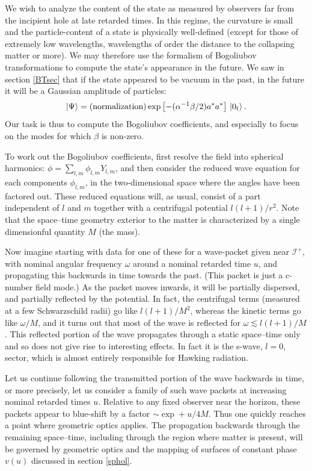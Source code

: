 \documentclass[
%
draft    %
,numberedheadings 
,bibliocites
  ]
  {aipproc}
\newcommand{\scrif}{{{\mathscr I}^{+}}}
\newcommand{\vv}{{v}}
\begin{document}
We wish to analyze the content of the state as measured by observers far from the incipient hole at late retarded times.  In this regime, the curvature is small and the particle-content of a state is physically well-defined (except for those of extremely low wavelengths, wavelengths of order the distance to the collapsing matter or more).  
We may therefore use the formalism of Bogoliubov transformations to compute the state's appearance in the future.  We saw in section \ref{BTsec} that if the state appeared to be vacuum in the past, in the future it will be a Gaussian amplitude of particles:
\begin{equation}
|\Psi \rangle =\mbox{(normalization)}\exp \left[-(\alpha ^{-1}\beta /2)a^*a^*\right]\, |0_{\rm f}\rangle\, .
\end{equation}
Our task is thus to compute the Bogoliubov coefficients, and especially to focus on the modes for which $\beta$ is non-zero.

To work out the Bogoliubov coefficients, first resolve the field into spherical harmonics:
$\phi =\sum _{l,m}\phi _{l,m} Y_{l,m}$, and then consider the reduced wave equation for each components $\phi _{l,m}$, in the two-dimensional space where the angles have been factored out.  These reduced equations will, as usual, consist of a part independent of $l$ and $m$ together with a centrifugal potential $l(l+1)/r^2$.
Note that the space--time geometry exterior to the matter is characterized by a single dimensionful quantity $M$ (the mass).



Now imagine starting with data for one of these for a wave-packet given near $\scrif$, with nominal angular frequency $\omega$ around a nominal retarded time $u$,
and propagating this backwards in time towards the past.
(This packet is just a c-number field mode.)
As the packet moves inwards, it will be partially dispersed, and partially reflected by the potential.  
In fact, the centrifugal terms (measured at a few Schwarzschild radii) go like $l(l+1)/M^2$, whereas the kinetic terms go like $\omega /M$, and it turns out that most of the wave is reflected for $\omega \lesssim l(l+1)/M$.  This reflected portion of the wave propagates through a static space--time only and so does not give rise to interesting effects.  In fact it is the s-wave, $l=0$, sector, which is almost entirely responsible for Hawking radiation.

Let us continue following the transmitted portion of the wave backwards in time, or more precisely, let us consider a family of such wave packets at increasing nominal retarded times $u$.
Relative to any fixed observer near the horizon, these packets appear to blue-shift by a factor $\sim\exp +u/4M$.  Thus one quickly reaches a point where geometric optics applies.  The propagation backwards through the remaining space--time, including through the region where matter is present, will be governed by geometric optics and the mapping of surfaces of constant phase $\vv (u)$ discussed in section \ref{sphol}.
\end{document}
